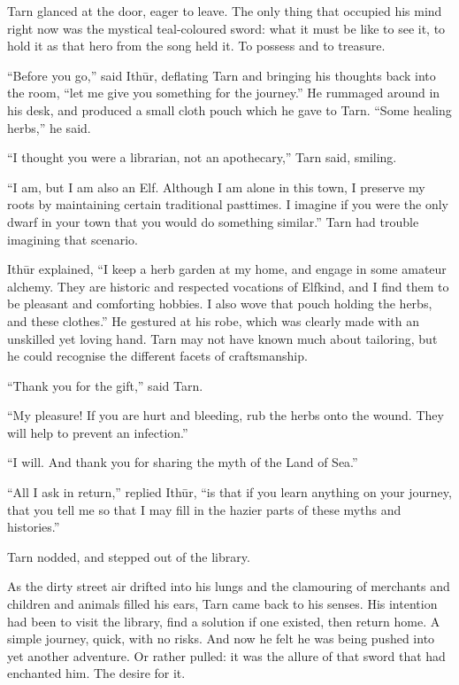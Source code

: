 Tarn glanced at the door, eager to leave.  The only thing that occupied his mind right now was the mystical teal-coloured sword: what it must be like to see it, to hold it as that hero from the song held it.  To possess and to treasure.

``Before you go,'' said Ith\=ur, deflating Tarn and bringing his thoughts back into the room, ``let me give you something for the journey.''  He rummaged around in his desk, and produced a small cloth pouch which he gave to Tarn.  ``Some healing herbs,'' he said.

``I thought you were a librarian, not an apothecary,'' Tarn said, smiling.

``I am, but I am also an Elf.  Although I am alone in this town, I preserve my roots by maintaining certain traditional pasttimes.  I imagine if you were the only dwarf in your town that you would do something similar.''  Tarn had trouble imagining that scenario.

Ith\=ur explained, ``I keep a herb garden at my home, and engage in some amateur alchemy.  They are historic and respected vocations of Elfkind, and I find them to be pleasant and comforting hobbies.  I also wove that pouch holding the herbs, and these clothes.''  He gestured at his robe, which was clearly made with an unskilled yet loving hand.  Tarn may not have known much about tailoring, but he could recognise the different facets of craftsmanship.

``Thank you for the gift,'' said Tarn.

``My pleasure!  If you are hurt and bleeding, rub the herbs onto the wound.  They will help to prevent an infection.''

``I will.  And thank you for sharing the myth of the Land of Sea.''

``All I ask in return,'' replied Ith\=ur, ``is that if you learn anything on your journey, that you tell me so that I may fill in the hazier parts of these myths and histories.''

Tarn nodded, and stepped out of the library.


As the dirty street air drifted into his lungs and the clamouring of merchants and children and animals filled his ears, Tarn came back to his senses.  His intention had been to visit the library, find a solution if one existed, then return home.  A simple journey, quick, with no risks.  And now he felt he was being pushed into yet another adventure.  Or rather pulled: it was the allure of that sword that had enchanted him.  The desire for it.

